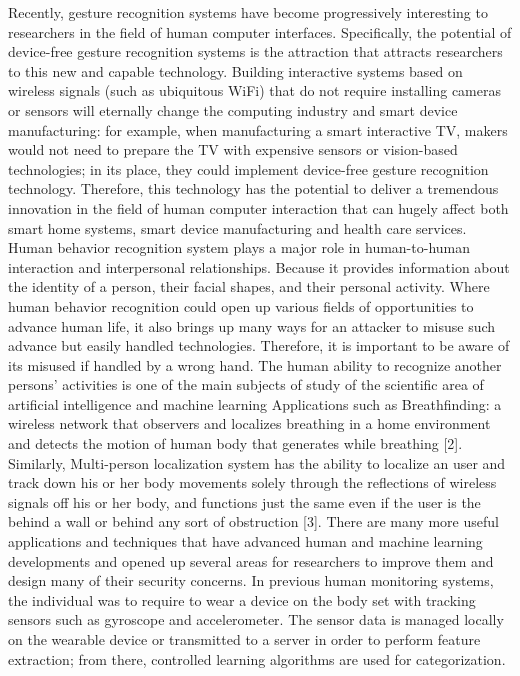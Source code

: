 \documentclass[conference]{IEEEtran}
\begin{document}
Recently, gesture recognition systems have become progressively interesting to researchers in the field of human computer interfaces. Specifically, the potential of device-free gesture recognition systems is the attraction that attracts researchers to this new and capable technology. Building interactive systems based on wireless signals (such as ubiquitous WiFi) that do not require installing cameras or sensors will eternally change the computing industry and smart device manufacturing: for example, when manufacturing a smart interactive TV, makers would not need to prepare the TV with expensive sensors or vision-based technologies; in its place, they could implement device-free gesture recognition technology. Therefore, this technology has the potential to deliver a tremendous innovation in the field of human computer interaction that can hugely affect both smart home systems, smart device manufacturing and health care services.
\newline
Human behavior recognition system plays a major role in
human-to-human interaction and interpersonal relationships.
Because it provides information about the identity of a
person, their facial shapes, and their personal activity. Where human behavior recognition could open up various fields of opportunities to advance human life, it also brings up many ways for an attacker to misuse such advance but easily handled technologies. Therefore, it is important to be aware of its misused if handled by a wrong hand.
\newline
The human ability to recognize another
persons’ activities is one of the main subjects of study of the
scientific area of artificial intelligence and machine learning
Applications such as Breathfinding: a wireless network that observers and localizes breathing in a home environment and detects the motion of human body that generates while breathing [2]. Similarly, Multi-person localization system has the ability to localize an user and track down his or her body movements solely through the reflections of wireless signals off his or her body, and functions just the same even if the user is the behind a wall or behind any sort of obstruction [3]. There are many more useful applications and techniques that have advanced human and machine learning developments and opened up several areas for researchers to improve them and design many of their security concerns. In previous human monitoring systems, the individual was to require to wear a device on the body set with tracking sensors such as gyroscope and accelerometer. The sensor data is managed locally on the wearable device or transmitted to a server in order to perform feature extraction; from there, controlled learning algorithms are used for categorization. \newline
\end{document}
